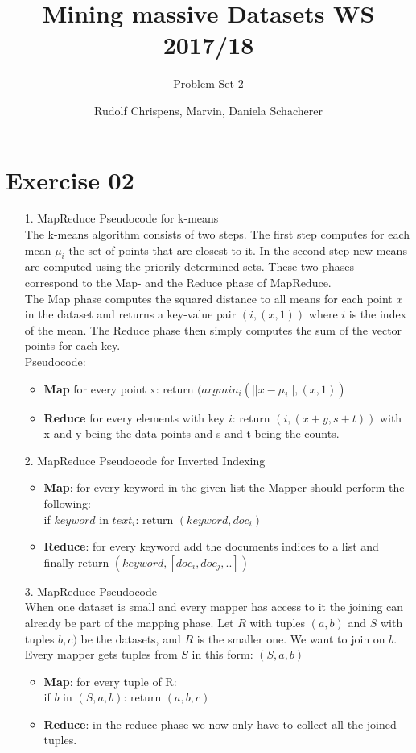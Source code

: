 \documentclass[11pt,a4paper]{scrartcl}
\title{Mining massive Datasets WS 2017/18}
\subtitle{Problem Set 2}
\author{Rudolf Chrispens, Marvin, Daniela Schacherer}
\begin{document}
\maketitle

\section*{Exercise 02}

	\begin{itemize}
		\item[1.] MapReduce Pseudocode for k-means\\
		The k-means algorithm consists of two steps. The first step computes for each mean $\mu_i$ the set of points that are closest to it. In the second step new means are computed using the priorily determined sets. These two phases correspond to the Map- and the Reduce phase of MapReduce. \\
The Map phase computes the squared distance to all means for each point $x$ in the dataset and returns a key-value pair $(i, (x,1))$ where $i$ is the index of the mean. The Reduce phase then simply computes the sum of the vector points for each key. \\
Pseudocode:
\begin{itemize}
	\item \textbf{Map} for every point x: return $(argmin_i(|| x- \mu_i ||, (x,1))$
	\item \textbf{Reduce} for every elements with key $i$: return $(i, (x+y, s+t))$ with x and y being the data points and s and t being the counts.
\end{itemize}

		\item[2.] MapReduce Pseudocode for Inverted Indexing\\
		\begin{itemize}
			\item \textbf{Map}: for every keyword in the given list the Mapper should perform the following: \\
		if $keyword$ in $text_i$: return $(keyword, doc_i)$
			\item \textbf{Reduce}: for every keyword add the documents indices to a list and finally return $(keyword, [doc_i, doc_j, ..])$
		\end{itemize}

		\item[3.] MapReduce Pseudocode \\
		When one dataset is small and every mapper has access to it the joining can already be part of the mapping phase. Let $R$ with tuples $(a,b)$ and $S$ with tuples $b,c)$ be the datasets, and $R$ is the smaller one. We want to join on $b$. Every mapper gets tuples from $S$ in this form: $(S,a,b)$
		\begin{itemize}
			\item \textbf{Map}: for every tuple of R: \\
			if $b$ in $(S,a,b)$: return $(a,b,c)$
			\item \textbf{Reduce}: in the reduce phase we now only have to collect all the joined tuples. 
		\end{itemize}



	\end{itemize}
	
\end{document}
